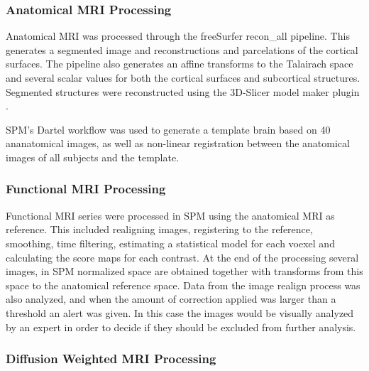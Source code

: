 \subsubsection{Anatomical MRI Processing}

Anatomical MRI was processed through the freeSurfer \autocite{dale_cortical_1999} recon\_all pipeline. This generates a segmented image and reconstructions and parcelations of the cortical surfaces. The pipeline also generates an affine transforms to the Talairach space and several scalar values for both the cortical surfaces and subcortical structures. Segmented structures were reconstructed using the 3D-Slicer model maker plugin \autocite{aucoin_modelmaker_2014}.

SPM's Dartel \autocite{ashburner_fast_2007} workflow was used to generate a template brain based on 40 ananatomical images, as well as non-linear registration between the anatomical images of all subjects and the template.

\subsubsection{Functional MRI Processing}

Functional MRI series were processed in SPM \autocite{friston_statistical_2006} using the anatomical MRI as reference. This included realigning images, registering to the reference, smoothing, time filtering, estimating a statistical model for each voexel and calculating the score maps for each contrast. At the end of the processing several images, in SPM normalized space are obtained together with transforms from this space to the anatomical reference space. Data from the image realign process was also analyzed, and when the amount of correction applied was larger than a threshold an alert was given. In this case the images would be visually analyzed by an expert in order to decide if they should be excluded from further  analysis.

\subsubsection{Diffusion Weighted MRI Processing}

